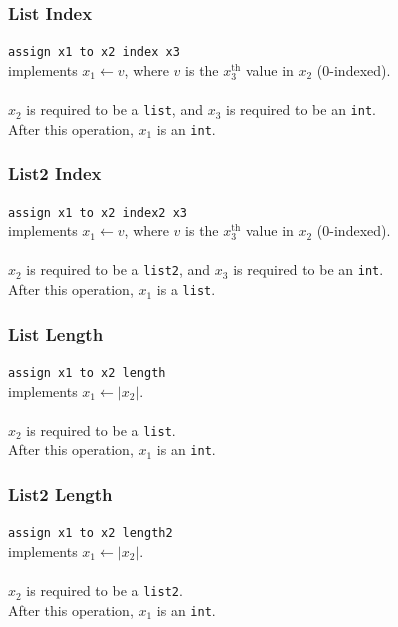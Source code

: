 \documentclass[11pt]{report}
\begin{document}
\subsubsection{List Index}

\texttt{assign x1 to x2 index x3} \\
implements $x_1 \leftarrow v$, where $v$ is the $x_3^{\textrm{th}}$ value in $x_2$ (0-indexed). \\ \\
$x_2$ is required to be a \texttt{list}, and $x_3$ is required to be an \texttt{int}. \\
After this operation, $x_1$ is an \texttt{int}.

\subsubsection{List2 Index}

\texttt{assign x1 to x2 index2 x3} \\
implements $x_1 \leftarrow v$, where $v$ is the $x_3^{\textrm{th}}$ value in $x_2$ (0-indexed). \\ \\
$x_2$ is required to be a \texttt{list2}, and $x_3$ is required to be an \texttt{int}. \\
After this operation, $x_1$ is a \texttt{list}.

\subsubsection{List Length}

\texttt{assign x1 to x2 length} \\
implements $x_1 \leftarrow |x_2|$. \\ \\ 
$x_2$ is required to be a \texttt{list}. \\
After this operation, $x_1$ is an \texttt{int}.

\subsubsection{List2 Length} 

\texttt{assign x1 to x2 length2} \\
implements $x_1 \leftarrow |x_2|$. \\ \\  
$x_2$ is required to be a \texttt{list2}. \\
After this operation, $x_1$ is an \texttt{int}.
\end{document}
